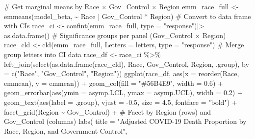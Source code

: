 \documentclass[
  letterpaper,
  DIV=11,
  numbers=noendperiod]{scrartcl}
\newenvironment{Shaded}{\begin{snugshade}}{\end{snugshade}}
\newcommand{\AttributeTok}[1]{\textcolor[rgb]{0.40,0.45,0.13}{#1}}
\newcommand{\CommentTok}[1]{\textcolor[rgb]{0.37,0.37,0.37}{#1}}
\newcommand{\FloatTok}[1]{\textcolor[rgb]{0.68,0.00,0.00}{#1}}
\newcommand{\FunctionTok}[1]{\textcolor[rgb]{0.28,0.35,0.67}{#1}}
\newcommand{\NormalTok}[1]{\textcolor[rgb]{0.00,0.23,0.31}{#1}}
\newcommand{\OtherTok}[1]{\textcolor[rgb]{0.00,0.23,0.31}{#1}}
\newcommand{\SpecialCharTok}[1]{\textcolor[rgb]{0.37,0.37,0.37}{#1}}
\newcommand{\StringTok}[1]{\textcolor[rgb]{0.13,0.47,0.30}{#1}}
\begin{document}
\begin{Shaded}
\begin{Highlighting}[]
\CommentTok{\# Get marginal means by Race × Gov\_Control × Region}
\NormalTok{emm\_race\_full }\OtherTok{\textless{}{-}} \FunctionTok{emmeans}\NormalTok{(model\_beta, }\SpecialCharTok{\textasciitilde{}}\NormalTok{ Race }\SpecialCharTok{|}\NormalTok{ Gov\_Control }\SpecialCharTok{*}\NormalTok{ Region)}
\CommentTok{\# Convert to data frame with CIs}
\NormalTok{race\_ci }\OtherTok{\textless{}{-}} \FunctionTok{confint}\NormalTok{(emm\_race\_full, }\AttributeTok{type =} \StringTok{"response"}\NormalTok{)}\SpecialCharTok{|\textgreater{}}
  \FunctionTok{as.data.frame}\NormalTok{()}
\CommentTok{\# Significance groups per panel (Gov\_Control × Region)}
\NormalTok{race\_cld }\OtherTok{\textless{}{-}} \FunctionTok{cld}\NormalTok{(emm\_race\_full, }\AttributeTok{Letters =}\NormalTok{ letters, }\AttributeTok{type =} \StringTok{"response"}\NormalTok{)}
\CommentTok{\# Merge group letters into CI data}
\NormalTok{race\_df }\OtherTok{\textless{}{-}}\NormalTok{ race\_ci }\SpecialCharTok{\%\textgreater{}\%}
  \FunctionTok{left\_join}\NormalTok{(}\FunctionTok{select}\NormalTok{(}\FunctionTok{as.data.frame}\NormalTok{(race\_cld), Race, Gov\_Control, Region, .group),}
            \AttributeTok{by =} \FunctionTok{c}\NormalTok{(}\StringTok{"Race"}\NormalTok{, }\StringTok{"Gov\_Control"}\NormalTok{, }\StringTok{"Region"}\NormalTok{))}
\FunctionTok{ggplot}\NormalTok{(race\_df, }\FunctionTok{aes}\NormalTok{(}\AttributeTok{x =} \FunctionTok{reorder}\NormalTok{(Race, emmean), }\AttributeTok{y =}\NormalTok{ emmean)) }\SpecialCharTok{+}
  \FunctionTok{geom\_col}\NormalTok{(}\AttributeTok{fill =} \StringTok{"\#56B4E9"}\NormalTok{, }\AttributeTok{width =} \FloatTok{0.6}\NormalTok{) }\SpecialCharTok{+}
  \FunctionTok{geom\_errorbar}\NormalTok{(}\FunctionTok{aes}\NormalTok{(}\AttributeTok{ymin =}\NormalTok{ asymp.LCL, }\AttributeTok{ymax =}\NormalTok{ asymp.UCL), }\AttributeTok{width =} \FloatTok{0.2}\NormalTok{) }\SpecialCharTok{+}
  \FunctionTok{geom\_text}\NormalTok{(}\FunctionTok{aes}\NormalTok{(}\AttributeTok{label =}\NormalTok{ .group), }\AttributeTok{vjust =} \SpecialCharTok{{-}}\FloatTok{0.5}\NormalTok{, }\AttributeTok{size =} \FloatTok{4.5}\NormalTok{, }\AttributeTok{fontface =} \StringTok{"bold"}\NormalTok{) }\SpecialCharTok{+}
  \FunctionTok{facet\_grid}\NormalTok{(Region }\SpecialCharTok{\textasciitilde{}}\NormalTok{ Gov\_Control) }\SpecialCharTok{+}  \CommentTok{\# Facet by Region (rows) and Gov\_Control (columns)}
  \FunctionTok{labs}\NormalTok{(}
    \AttributeTok{title =} \StringTok{"Adjusted COVID{-}19 Death Proportion by Race, Region, and Government Control"}\NormalTok{,}

\end{Highlighting}
\end{Shaded}
\end{document}
